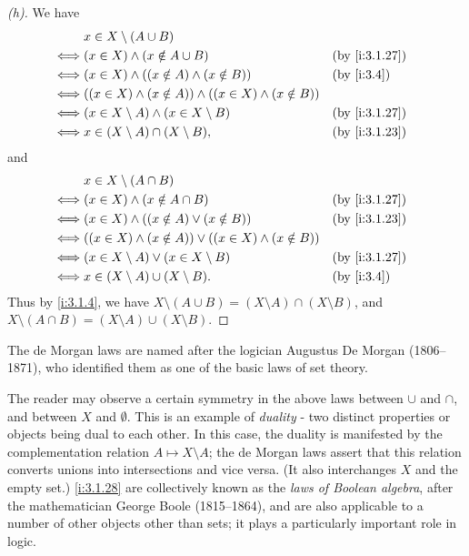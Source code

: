 \begin{proof}[(h)]
  We have
  \begin{align*}
         & x \in X \setminus (A \cup B)                                                           \\
    \iff & (x \in X) \land (x \notin A \cup B)                                 &  & \by{i:3.1.27} \\
    \iff & (x \in X) \land ((x \notin A) \land (x \notin B))                   &  & \by{i:3.4}    \\
    \iff & ((x \in X) \land (x \notin A)) \land ((x \in X) \land (x \notin B))                    \\
    \iff & (x \in X \setminus A) \land (x \in X \setminus B)                   &  & \by{i:3.1.27} \\
    \iff & x \in (X \setminus A) \cap (X \setminus B),                         &  & \by{i:3.1.23}
  \end{align*}
  and
  \begin{align*}
         & x \in X \setminus (A \cap B)                                                          \\
    \iff & (x \in X) \land (x \notin A \cap B)                                &  & \by{i:3.1.27} \\
    \iff & (x \in X) \land ((x \notin A) \lor (x \notin B))                   &  & \by{i:3.1.23} \\
    \iff & ((x \in X) \land (x \notin A)) \lor ((x \in X) \land (x \notin B))                    \\
    \iff & (x \in X \setminus A) \lor (x \in X \setminus B)                   &  & \by{i:3.1.27} \\
    \iff & x \in (X \setminus A) \cup (X \setminus B).                        &  & \by{i:3.4}
  \end{align*}
  Thus by \cref{i:3.1.4}, we have \(X \setminus (A \cup B) = (X \setminus A) \cap (X \setminus B)\), and \(X \setminus (A \cap B) = (X \setminus A) \cup (X \setminus B)\).
\end{proof}

\begin{rmk}\label{i:3.1.29}
  The de Morgan laws are named after the logician Augustus De Morgan (1806--1871), who identified them as one of the basic laws of set theory.
\end{rmk}

\begin{rmk}\label{i:3.1.30}
  The reader may observe a certain symmetry in the above laws between \(\cup\) and \(\cap\), and between \(X\) and \(\emptyset\).
  This is an example of \emph{duality} - two distinct properties or objects being dual to each other.
  In this case, the duality is manifested by the complementation relation \(A \mapsto X \setminus A\);
  the de Morgan laws assert that this relation converts unions into intersections and vice versa.
  (It also interchanges \(X\) and the empty set.)
  \cref{i:3.1.28} are collectively known as the \emph{laws of Boolean algebra}, after the mathematician George Boole (1815--1864), and are also applicable to a number of other objects other than sets;
  it plays a particularly important role in logic.
\end{rmk}

